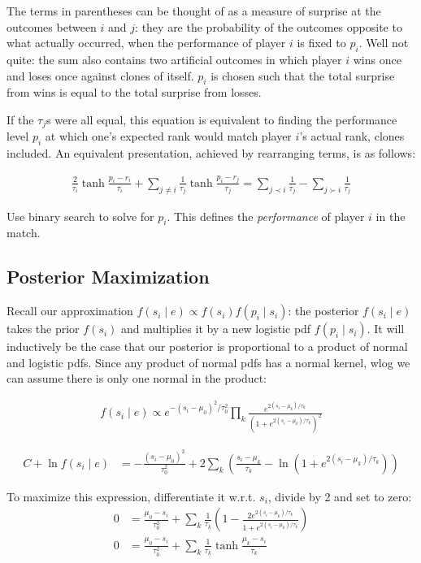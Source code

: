 \documentclass{article}
\begin{document}
The terms in parentheses can be thought of as a measure of surprise at the outcomes between $i$ and $j$: they are the probability of the outcomes opposite to what actually occurred, when the performance of player $i$ is fixed to $p_i$. Well not quite: the sum also contains two artificial outcomes in which player $i$ wins once and loses once against clones of itself. $p_i$ is chosen such that the total surprise from wins is equal to the total surprise from losses.

If the $\tau_j$s were all equal, this equation is equivalent to finding the performance level $p_i$ at which one's expected rank would match player $i$'s actual rank, clones included. An equivalent presentation, achieved by rearranging terms, is as follows:

\begin{align}
\frac{2}{\tau_i} \tanh\frac {p_i - r_i} {\tau_i} + \sum_{j\neq i}\frac{1}{\tau_j} \tanh\frac {p_i - r_j} {\tau_j} = \sum_{j\prec i} \frac{1}{\tau_j} - \sum_{j\succ i} \frac{1}{\tau_j}
\end{align}

Use binary search to solve for $p_i$. This defines the \emph{performance} of player $i$ in the match.

\subsection{Posterior Maximization}

Recall our approximation $f(s_i\mid e) \propto f(s_i)f(p_i\mid s_i)$: the posterior $f(s_i \mid e)$ takes the prior $f(s_i)$ and multiplies it by a new logistic pdf $f(p_i\mid s_i)$. It will inductively be the case that our posterior is proportional to a product of normal and logistic pdfs. Since any product of normal pdfs has a normal kernel, wlog we can assume there is only one normal in the product:

\begin{align}
f(s_i\mid e) \propto e^{-(s_i-\mu_0)^2/\tau_0^2} \prod_k \frac { e^{2(s_i-\mu_k)/\tau_k} } { \left(1 + e^{2(s_i-\mu_k)/\tau_k} \right)^2 }
\end{align}

\begin{align}
C + \ln f(s_i \mid e) &= -\frac{(s_i-\mu_0)^2}{\tau_0^2} + 2\sum_k \left( \frac{s_i-\mu_k}{\tau_k} - \ln(1 + e^{2(s_i-\mu_k)/\tau_k}) \right)
\end{align}

To maximize this expression, differentiate it w.r.t. $s_i$, divide by 2 and set to zero:
\begin{align}
0 &= \frac{\mu_0-s_i}{\tau_0^2} + \sum_k \frac{1}{\tau_k}\left( 1 - \frac {2e^{2(s_i-\mu_k)/\tau_k}} {1 + e^{2(s_i-\mu_k)/\tau_k}} \right)
\\0 &=  \frac{\mu_0-s_i}{\tau_0^2} + \sum_k \frac{1}{\tau_k} \tanh \frac {\mu_k-s_i} {\tau_k}
\end{align}
\end{document}
